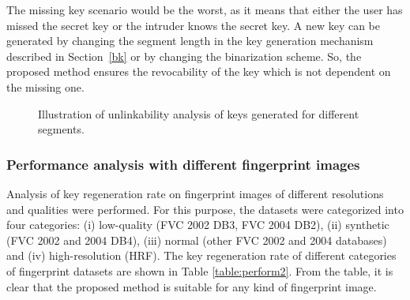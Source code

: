 %
The missing key scenario would be the worst, as it means that either the user has
missed the secret key or the intruder knows the secret key. A new key can be
generated by changing the segment length in the key generation mechanism
described in Section~\ref{bk} or by changing the binarization scheme. So, the
proposed method ensures the revocability of the key which is not dependent on the
missing one. 
\par 

\begin{figure}[!ht]
	\centering
	 
	\caption{Illustration of  unlinkability analysis of keys generated for different segments.}
	\label{fig:quant}
	\vspace{-4mm}
\end{figure}


\subsubsection{
	Performance analysis with different fingerprint images
	}
Analysis of key regeneration rate on fingerprint images of different resolutions and
qualities were performed. For this purpose, the datasets were categorized into
four categories: 
(i) low-quality (FVC 2002 DB3, FVC 2004 DB2), 
(ii) synthetic (FVC 2002 and 2004 DB4), 
(iii) normal (other FVC 2002 and 2004 databases) and
(iv) high-resolution (HRF). The key regeneration rate of different categories of
fingerprint datasets are shown in Table \ref{table:perform2}. From the table, it is
clear that the proposed method is suitable for any kind of fingerprint image.

